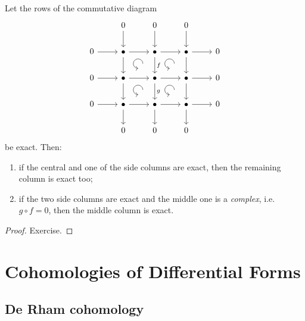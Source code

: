 \begin{lem}\label{3x3-lemma}
    Let the rows of the commutative diagram
    \[\begin{tikzcd}[every matrix/.append style={name=m},   
        execute at end picture={\draw [<-] ([xshift=-7mm,yshift=-9mm]m-2-3.north) arc[start angle=-90,delta angle=-270,radius=0.2cm];
        \draw [<-] ([xshift=-7mm,yshift=-9mm]m-2-4.north) arc[start angle=-90,delta angle=-270,radius=0.2cm];
        \draw [<-] ([xshift=-7mm,yshift=-9mm]m-3-3.north) arc[start angle=-90,delta angle=-270,radius=0.2cm];
        \draw [<-] ([xshift=-7mm,yshift=-9mm]m-3-4.north) arc[start angle=-90,delta angle=-270,radius=0.2cm];}]
        &0\arrow[d]&0\arrow[d]&0\arrow[d]&\\
        0\arrow[r]& \bullet \arrow[r]\arrow[d] & \bullet\arrow[r]\arrow[d,"f"] & \bullet \arrow[r]\arrow[d] & 0\\
        0\arrow[r]& \bullet \arrow[r]\arrow[d] & \bullet\arrow[r]\arrow[d,"g"] & \bullet \arrow[r]\arrow[d] & 0\\
       0\arrow[r]& \bullet\arrow[r]\arrow[d] & \bullet\arrow[r]\arrow[d] & \bullet\arrow[r]\arrow[d] &0\\
       &0&0&0&
    \end{tikzcd}\]
    be exact. Then:
    \begin{enumerate}
        \item if the central and one of the side columns are exact, then the remaining column is exact too;
        \item if the two side columns are exact and the middle one is a \emph{complex}, i.e.\ $g\circ f=0$, then the middle column is exact.
    \end{enumerate}
\end{lem}
\begin{proof}
    Exercise.
\end{proof}







\clearpage
\section{Cohomologies of Differential Forms}

\subsection{De Rham cohomology}


